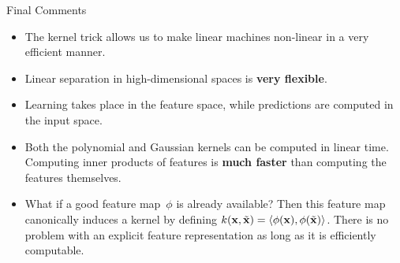 \documentclass[11pt,compress,t,notes=noshow, xcolor=table]{beamer}
\begin{document}
\begin{vbframe}{Final Comments}

\begin{itemize}
\item The kernel trick allows us to make linear machines non-linear in a very
  efficient manner.
\item Linear separation in high-dimensional spaces is \textbf{very flexible}.

  \item Learning takes place in the feature space, while predictions are computed in the input space.
  \item Both the polynomial and Gaussian kernels can be computed in linear time. Computing inner products of features is \textbf{much faster} than computing the features themselves.
\item What if a good feature map~$\phi$ is already available?
Then this feature map canonically induces a kernel by
defining $k(\mathbf{x}, \tilde {\mathbf{x}}) = \left\langle \phi(\mathbf{x}), \phi(\tilde {\mathbf{x}}) \right\rangle$.
There is no problem with an explicit feature representation
as long as it is efficiently computable.
\end{itemize}
\end{vbframe}


\endlecture
\end{document}
